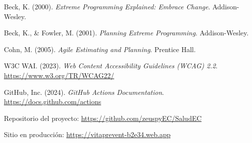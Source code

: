 \documentclass[12pt, a4paper]{article}
\begin{document}
\begin{enumerate}[label={[\arabic*]}]
  \item Beck, K. (2000). \textit{Extreme Programming Explained: Embrace Change}. Addison-Wesley.

  \item Beck, K., \& Fowler, M. (2001). \textit{Planning Extreme Programming}. Addison-Wesley.

  \item Cohn, M. (2005). \textit{Agile Estimating and Planning}. Prentice Hall.

  \item W3C WAI. (2023). \textit{Web Content Accessibility Guidelines (WCAG) 2.2}. \url{https://www.w3.org/TR/WCAG22/}

  \item GitHub, Inc. (2024). \textit{GitHub Actions Documentation}. \url{https://docs.github.com/actions}

  \item Repositorio del proyecto: \url{https://github.com/zeuspyEC/SaludEC}

  \item Sitio en producción: \url{https://vitaprevent-b2e34.web.app}
\end{enumerate}
\end{document}
